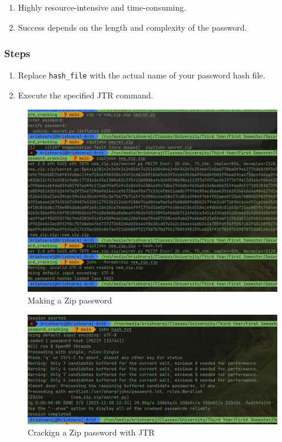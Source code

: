 \documentclass[11pt]{article}
\begin{document}
\begin{enumerate}
    \item Highly resource-intensive and time-consuming.
    \item Success depends on the length and complexity of the password.
\end{enumerate}

\subsubsection{Steps}

\begin{enumerate}
    \item Replace \texttt{hash\_file} with the actual name of your password hash file.
    \item Execute the specified JTR command.
\end{enumerate}



\begin{figure}[H]
    \centering
    \includegraphics[width=.95\textwidth]{john the ripper/zip pass.png}
    \caption{Making a Zip password}
\end{figure}

\begin{figure}[H]
    \centering
    \includegraphics[width=.95\textwidth]{john the ripper/zip cracked.png}
    \caption{Crackign a Zip password with JTR}
\end{figure}
\end{document}
